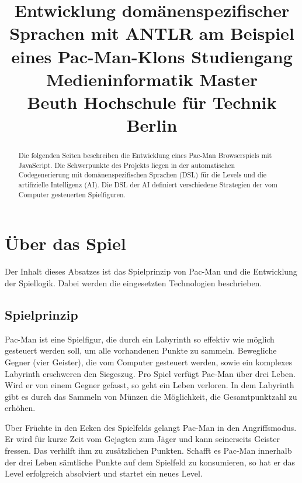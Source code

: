 \documentclass[conference]{IEEEtran}
\begin{document}
\title{%
  Entwicklung domänenspezifischer Sprachen mit ANTLR am Beispiel eines Pac-Man-Klons\bigbreak
  \large Studiengang Medieninformatik Master\\Beuth Hochschule für Technik Berlin}


\author{
\and
{}
\and
{}
}

\maketitle

\lstset{%
  basicstyle=\footnotesize\ttfamily
  }
\begin{abstract}
Die folgenden Seiten beschreiben die Entwicklung eines Pac-Man Browserspiels mit JavaScript. Die Schwerpunkte des Projekts liegen in der automatischen Codegenerierung mit domänenspezifischen Sprachen (DSL) für die Levels und die artifizielle Intelligenz (AI). Die DSL der AI definiert verschiedene Strategien der vom  Computer gesteuerten Spielfiguren.
\end{abstract}

\IEEEpeerreviewmaketitle



\section{Über das Spiel}

Der Inhalt dieses Absatzes ist das Spielprinzip von Pac-Man und die Entwicklung der Spiellogik. Dabei werden die eingesetzten Technologien beschrieben.

\subsection{Spielprinzip}

Pac-Man ist eine Spielfigur, die durch ein Labyrinth so effektiv wie möglich gesteuert werden soll, um alle vorhandenen Punkte zu sammeln. Bewegliche Gegner (vier Geister), die vom Computer gesteuert werden, sowie ein komplexes Labyrinth erschweren den Siegeszug. Pro Spiel verfügt Pac-Man über drei Leben. Wird er von einem Gegner gefasst, so geht ein Leben verloren. In dem Labyrinth gibt es durch das Sammeln von Münzen die Möglichkeit, die Gesamtpunktzahl zu erhöhen.

Über Früchte in den Ecken des Spielfelds gelangt Pac-Man in den Angriffsmodus. Er wird für kurze Zeit vom Gejagten zum Jäger und kann seinerseits Geister fressen. Das verhilft ihm zu zusätzlichen Punkten. Schafft es Pac-Man innerhalb der drei Leben sämtliche Punkte auf dem Spielfeld zu konsumieren, so hat er das Level erfolgreich absolviert und startet ein neues Level.
\end{document}
